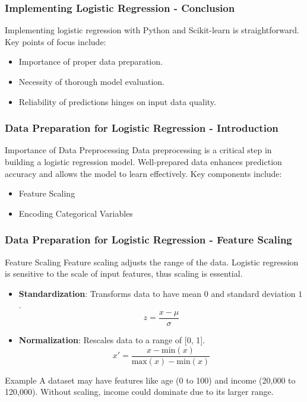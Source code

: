 \documentclass[aspectratio=169]{beamer}
\begin{document}
\begin{frame}[fragile]
    \frametitle{Implementing Logistic Regression - Conclusion}
    Implementing logistic regression with Python and Scikit-learn is straightforward. Key points of focus include:
    \begin{itemize}
        \item Importance of proper data preparation.
        \item Necessity of thorough model evaluation.
        \item Reliability of predictions hinges on input data quality.
    \end{itemize}
\end{frame}

\begin{frame}[fragile]
  \frametitle{Data Preparation for Logistic Regression - Introduction}
  \begin{block}{Importance of Data Preprocessing}
    Data preprocessing is a critical step in building a logistic regression model. Well-prepared data enhances prediction accuracy and allows the model to learn effectively. Key components include:
  \end{block}
  \begin{itemize}
    \item Feature Scaling
    \item Encoding Categorical Variables
  \end{itemize}
\end{frame}

\begin{frame}[fragile]
  \frametitle{Data Preparation for Logistic Regression - Feature Scaling}
  \begin{block}{Feature Scaling}
    Feature scaling adjusts the range of the data. Logistic regression is sensitive to the scale of input features, thus scaling is essential.
  \end{block}
  
  \begin{itemize}
    \item \textbf{Standardization}: Transforms data to have mean $0$ and standard deviation $1$.
      \begin{equation}
      z = \frac{x - \mu}{\sigma}
      \end{equation}
    \item \textbf{Normalization}: Rescales data to a range of [0, 1].
      \begin{equation}
      x' = \frac{x - \text{min}(x)}{\text{max}(x) - \text{min}(x)}
      \end{equation}
  \end{itemize}

  \begin{block}{Example}
    A dataset may have features like age (0 to 100) and income (20,000 to 120,000). Without scaling, income could dominate due to its larger range.
  \end{block}
\end{frame}
\end{document}
